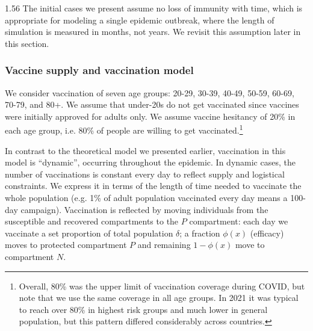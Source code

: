\documentclass[12pt]{article}
\begin{document}
\begin{spacing}{1.56}
The initial cases we present assume no loss of immunity with time, which is appropriate for modeling a single epidemic outbreak, where the length of simulation is measured in months, not years. We revisit this assumption later in this section.



\subsubsection{Vaccine supply and vaccination model}

We consider vaccination of seven age groups: 20-29, 30-39, 40-49, 50-59, 60-69, 70-79, and 80+. We assume that under-20s do not get vaccinated since vaccines were initially approved for adults only. We assume vaccine hesitancy of 20\% in each age group, i.e. 80\% of people are willing to get vaccinated.\footnote{Overall, 80\% was the upper limit of vaccination coverage during COVID, but note that we use the same coverage in all age groups. In 2021 it was typical to reach over 80\% in highest risk groups and much lower in general population, but this pattern differed considerably across countries.}


In contrast to the theoretical model we presented earlier, vaccination in this model is ``dynamic'', occurring throughout the epidemic. In dynamic cases, the number of vaccinations is constant every day to reflect supply and logistical constraints. We express it in terms of the length of time needed to vaccinate the whole population (e.g. 1\% of adult population vaccinated every day means a 100-day campaign). Vaccination is reflected by moving individuals from the susceptible and recovered compartments to the $P$ compartment: each day we vaccinate a set proportion of total population $\delta$; a fraction $\phi(x)$ (efficacy) moves to protected compartment $P$ and remaining $1-\phi(x)$ move to compartment $N$.


\end{spacing}
\end{document}
